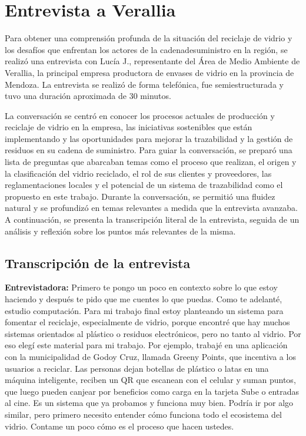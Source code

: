 \chapter{Entrevista a Verallia}
\label{cp:verallia-interview}

\parindent0pt

Para obtener una comprensión profunda de la situación del reciclaje de vidrio y los desafíos que enfrentan los actores de la \gls{cadenadesuministro} en la región, se realizó una entrevista con Lucía J., representante del Área de Medio Ambiente de Verallia, la principal empresa productora de envases de vidrio en la provincia de Mendoza. La entrevista se realizó de forma telefónica, fue semiestructurada y tuvo una duración aproximada de 30 minutos.

La conversación se centró en conocer los procesos actuales de producción y reciclaje de vidrio en la empresa, las iniciativas sostenibles que están implementando y las oportunidades para mejorar la \gls{trazabilidad} y la gestión de residuos en su cadena de suministro. Para guiar la conversación, se preparó una lista de preguntas que abarcaban temas como el proceso que realizan, el origen y la clasificación del vidrio reciclado, el rol de sus clientes y proveedores, las reglamentaciones locales y el potencial de un sistema de trazabilidad como el propuesto en este trabajo. Durante la conversación, se permitió una fluidez natural y se profundizó en temas relevantes a medida que la entrevista avanzaba. A continuación, se presenta la transcripción literal de la entrevista, seguida de un análisis y reflexión sobre los puntos más relevantes de la misma.

\section{Transcripción de la entrevista}

\textbf{Entrevistadora:} Primero te pongo un poco en contexto sobre lo que estoy haciendo y después te pido que me cuentes lo que puedas. Como te adelanté, estudio computación. Para mi trabajo final estoy planteando un sistema para fomentar el reciclaje, especialmente de vidrio, porque encontré que hay muchos sistemas orientados al plástico o residuos electrónicos, pero no tanto al vidrio. Por eso elegí este material para mi trabajo. Por ejemplo, trabajé en una aplicación con la municipalidad de Godoy Cruz, llamada Greeny Points, que incentiva a los usuarios a reciclar. Las personas dejan botellas de plástico o latas en una máquina inteligente, reciben un QR que escanean con el celular y suman puntos, que luego pueden canjear por beneficios como carga en la tarjeta Sube o entradas al cine. Es un sistema que ya probamos y funciona muy bien. Podría ir por algo similar, pero primero necesito entender cómo funciona todo el ecosistema del vidrio. Contame un poco cómo es el proceso que hacen ustedes.

